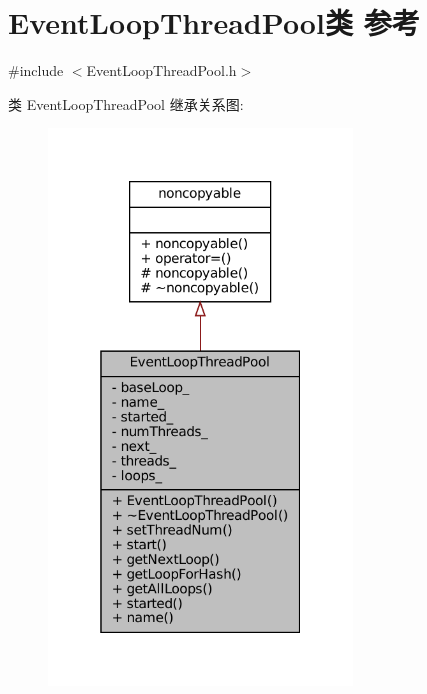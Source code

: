\hypertarget{classmuduo_1_1net_1_1EventLoopThreadPool}{}\section{Event\+Loop\+Thread\+Pool类 参考}
\label{classmuduo_1_1net_1_1EventLoopThreadPool}


{\ttfamily \#include $<$Event\+Loop\+Thread\+Pool.\+h$>$}



类 Event\+Loop\+Thread\+Pool 继承关系图\+:
\nopagebreak
\begin{figure}[H]
\begin{center}
\leavevmode
\includegraphics[width=229pt]{classmuduo_1_1net_1_1EventLoopThreadPool__inherit__graph}
\end{center}
\end{figure}


